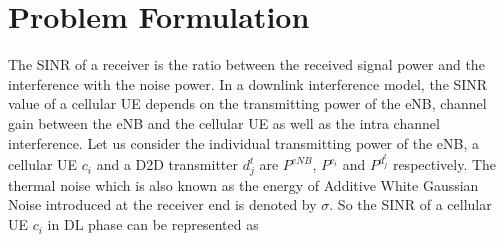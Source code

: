 \documentclass[times]{dacauth}
\begin{document}
		  
	
	







\section{Problem Formulation}\label{section:Problem Formulation}
\vspace {-0.3cm}
\noindent
The SINR of a receiver is the ratio between the received signal power and the interference with the noise power. In a downlink interference model, the SINR value of a cellular UE depends on the transmitting power of the eNB, channel gain between the eNB and the cellular UE as well as the intra channel interference. Let us consider the individual transmitting power of the eNB, a cellular UE $c_i$ and a D2D transmitter $d_j^t$ are $P^{eNB}$, $P^{c_i}$ and $P^{d_j^t}$ respectively. The thermal noise which is also known as the energy of Additive White Gaussian Noise introduced at the receiver end is denoted by $\sigma$. So the SINR of a cellular UE $c_i$ in DL phase \cite{zulhasnine} can be represented as
\end{document}
